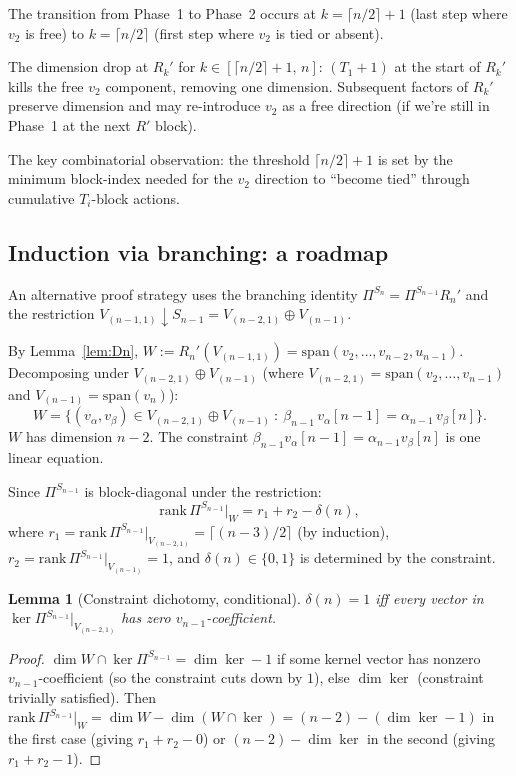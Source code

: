 \documentclass[11pt]{article}
\newtheorem{lemma}[theorem]{Lemma}
\theoremstyle{definition}
\begin{document}
The transition from Phase~1 to Phase~2 occurs at
$k=\lceil n/2\rceil+1$ (last step where $v_2$ is free) to $k=\lceil n/2\rceil$
(first step where $v_2$ is tied or absent).

The dimension drop at $R_k'$ for $k\in[\lceil n/2\rceil+1,\,n]$:
$(T_1{+}1)$ at the start of $R_k'$ kills the free $v_2$ component,
removing one dimension. Subsequent factors of $R_k'$ preserve dimension
and may re-introduce $v_2$ as a free direction (if we're still in
Phase~1 at the next $R'$ block).

The key combinatorial observation: the threshold $\lceil n/2\rceil+1$
is set by the minimum block-index needed for the $v_2$ direction to
``become tied'' through cumulative $T_i$-block actions.

\subsection{Induction via branching: a roadmap}\label{ssec:branching}

An alternative proof strategy uses the branching identity
$\Pi^{S_n}=\Pi^{S_{n-1}}R_n'$ and the restriction
$V_{(n-1,1)}\!\downarrow\!{S_{n-1}}=V_{(n-2,1)}\oplus V_{(n-1)}$.

By Lemma~\ref{lem:Dn}, $W:=R_n'(V_{(n-1,1)})=\mathrm{span}(v_2,\ldots,v_{n-2},u_{n-1})$.
Decomposing under $V_{(n-2,1)}\oplus V_{(n-1)}$ (where
$V_{(n-2,1)}=\mathrm{span}(v_2,\ldots,v_{n-1})$ and
$V_{(n-1)}=\mathrm{span}(v_n)$):
\[
   W=\bigl\{(v_\alpha,v_\beta)\in V_{(n-2,1)}\oplus V_{(n-1)}\ :\ \beta_{n-1}\,v_\alpha[n-1]=\alpha_{n-1}\,v_\beta[n]\bigr\}.
\]
$W$ has dimension $n-2$. The constraint $\beta_{n-1}v_\alpha[n-1]=\alpha_{n-1}v_\beta[n]$
is one linear equation.

Since $\Pi^{S_{n-1}}$ is block-diagonal under the restriction:
\[
   \mathrm{rank}\,\Pi^{S_{n-1}}|_W = r_1 + r_2 - \delta(n),
\]
where $r_1=\mathrm{rank}\,\Pi^{S_{n-1}}|_{V_{(n-2,1)}}=\lceil(n-3)/2\rceil$ (by induction),
$r_2=\mathrm{rank}\,\Pi^{S_{n-1}}|_{V_{(n-1)}}=1$, and
$\delta(n)\in\{0,1\}$ is determined by the constraint.

\begin{lemma}[Constraint dichotomy, conditional]\label{lem:dichotomy}
$\delta(n)=1$ iff every vector in $\ker\Pi^{S_{n-1}}|_{V_{(n-2,1)}}$ has
zero $v_{n-1}$-coefficient.
\end{lemma}
\begin{proof}
$\dim W\cap\ker\Pi^{S_{n-1}} = \dim\ker - 1$ if some kernel vector
has nonzero $v_{n-1}$-coefficient (so the constraint cuts down by $1$),
else $\dim\ker$ (constraint trivially satisfied). Then
$\mathrm{rank}\,\Pi^{S_{n-1}}|_W = \dim W - \dim(W\cap\ker) =
(n-2) - (\dim\ker - 1)$ in the first case (giving $r_1+r_2-0$) or
$(n-2)-\dim\ker$ in the second (giving $r_1+r_2-1$).
\end{proof}
\end{document}
